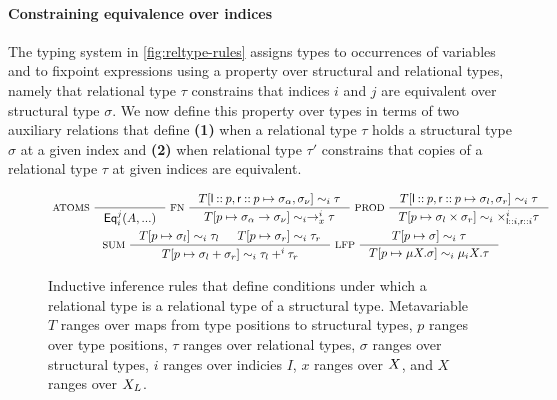 \paragraph{Constraining equivalence over indices}
%
The typing system in \autoref{fig:reltype-rules} assigns types to
occurrences of variables and to fixpoint expressions using a property
over structural and relational types, namely that relational type
$\tau$ constrains that indices $i$ and $j$ are equivalent over
structural type $\sigma$.
%
We now define this property over types in terms of two auxiliary
relations that define \textbf{(1)} when a relational type $\tau$ holds
a structural type $\sigma$ at a given index and \textbf{(2)} when
relational type $\tau'$ constrains that copies of a relational type
$\tau$ at given indices are equivalent.

\begin{figure}
  \centering
  \begin{gather*}
    \inference[ ATOMS ]{ }{ \iseq{i}{j}(A, ...) } 
    \inference[ FN ]{ 
      \upd{ T }{ %
        \leftchild \cons p, \rightchild \cons p }{ %
        \sigma_{\alpha}, \sigma_{\nu} } \hasreltype{i} \tau }{
      \upd{ T }{ p }{ \sigma_{\alpha} \to \sigma_{\nu} } \hasreltype{i}
      \to^i_x \tau } 
    \inference[ PROD ]{
      \upd{ T }{ %
        \leftchild \cons p, \rightchild \cons p }{ %
        \sigma_l, \sigma_r } \hasreltype{i} \tau }{
      \upd{ T }{ p }{ \sigma_l \times \sigma_r } \hasreltype{i}
      \times_{ \leftchild \cons i, \rightchild \cons i }^{i} \tau } \\
    \inference[ SUM ]{
      \upd{ T }{ p }{ \sigma_l } \hasreltype{i} \tau_l &
      \upd{ T }{ p }{ \sigma_r } \hasreltype{i} \tau_r }{
      \upd{ T }{ p }{ \sigma_l + \sigma_r } \hasreltype{i}
      \tau_l +^{i} \tau_r } 
    \inference[ LFP ]{
      \upd{ T }{ p }{ \sigma } \hasreltype{i} \tau }{
      \upd{ T }{ p }{ \mu X. \sigma } \hasreltype{i}
      \mu_i X. \tau }
  \end{gather*}
  \caption{Inductive inference rules that define conditions under which a relational type is a relational type of a structural type.
    Metavariable $T$ ranges over maps from type positions to structural types, %
    $p$ ranges over type positions, %
    $\tau$ ranges over relational types, %
    $\sigma$ ranges over structural types, %
    $i$ ranges over indicies $I$, %
    $x$ ranges over $X$, and %
    $X$ ranges over $X_L$. }
  \label{fig:eq-test}
\end{figure}

